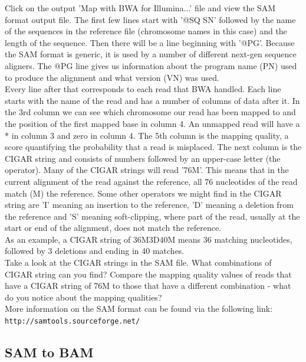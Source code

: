 \documentclass[12pt,a4paper]{article}
\begin{document}
Click on the output 'Map with BWA for Illumina...' file and view the
SAM format output file. The first few lines start with '@SQ SN'
followed by the name of the sequences in the reference file
(chromosome names in this case) and the length of the sequence. Then
there will be a line beginning with '@PG'. Because the SAM format is
generic, it is used by a number of different next-gen sequence
aligners. The @PG line gives us information about the program name
(PN) used to produce the alignment and what version (VN) was used.\\ 

Every line after that corresponds to each read that BWA
handled. Each line starts with the name of the read and has a number
of columns of data after it. In the 3rd column we can see which
chromosome our read has been mapped to and the position of the first
mapped base in column 4. An unmapped read will have a * in column 3
and zero in column 4. The 5th column is the mapping quality, a score
quantifying the probability that a read is misplaced. The next column
is the CIGAR string and consists of numbers followed by an upper-case
letter (the operator). Many of the CIGAR strings will read '76M'. This
means that in the current alignment of the read against the reference,
all 76 nucleotides of the read match (M) the reference. Some other
operators we might find in the CIGAR string are 'I' meaning an
insertion to the reference, 'D' meaning a deletion from the reference
and 'S' meaning soft-clipping, where part of the read, usually at the
start or end of the alignment, does not match the reference. \\

As an example, a CIGAR string of 36M3D40M means 36 matching
nucleotides, followed by 3 deletions and ending in 40 matches.  \\

Take a look at the CIGAR strings in the SAM file. What combinations
of CIGAR string can you find? Compare the mapping quality values of
reads that have a CIGAR string of 76M to those that have a different
combination - what do you notice about the mapping qualities?  \\

More information on the SAM format can be found via the following
link: \\

\texttt{http://samtools.sourceforge.net/}

\subsection{SAM to BAM}
\end{document}
